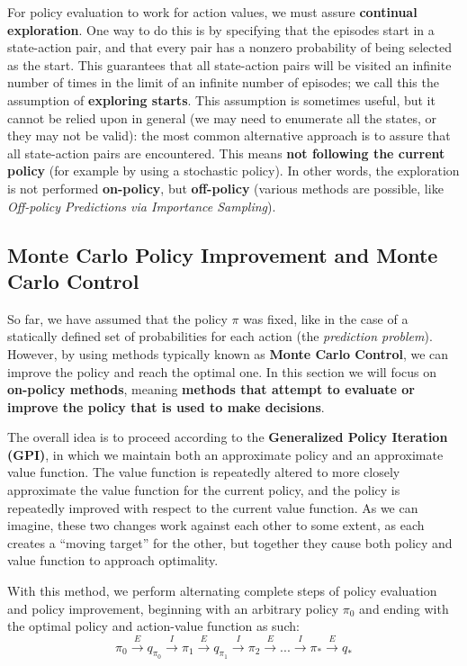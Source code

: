 For policy evaluation to work for action values, we must assure \textbf{continual exploration}. One way to do this is by specifying that the episodes start in a state-action pair, and that every pair has a nonzero probability of being selected as the start. This guarantees that all state-action pairs will be visited an infinite number of times in the limit of an infinite number of episodes; we call this the assumption of \textbf{exploring starts}. This assumption is sometimes useful, but it cannot be relied upon in general (we may need to enumerate all the states, or they may not be valid): the most common alternative approach is to assure that all state-action pairs are encountered. This means \textbf{not following the current policy} (for example by using a stochastic policy). In other words, the exploration is not performed \textbf{on-policy}, but \textbf{off-policy} (various methods are possible, like \textit{Off-policy Predictions via Importance Sampling}).

\subsection{Monte Carlo Policy Improvement and Monte Carlo Control}
So far, we have assumed that the policy $\pi$ was fixed, like in the case of a statically defined set of probabilities for each action (the \textit{prediction problem}). However, by using methods typically known as \textbf{Monte Carlo Control}, we can improve the policy and reach the optimal one. In this section we will focus on \textbf{on-policy methods}, meaning \textbf{methods that attempt to evaluate or improve the policy that is used to make decisions}.

The overall idea is to proceed according to the \textbf{Generalized Policy Iteration (GPI)}, in which we maintain both an approximate policy and an approximate value function. The value function is repeatedly altered to more closely approximate the value function for the current policy, and the policy is repeatedly improved with respect to the current value function. As we can imagine, these two changes work against each other to some extent, as each creates a ``moving target'' for the other, but together they cause both policy and value function to approach optimality.

With this method, we perform alternating complete steps of policy evaluation and policy improvement, beginning with an arbitrary policy $\pi_0$ and ending with the optimal policy and action-value function as such:
\begin{equation}
    \pi_0 \overset{E}{\rightarrow} q_{\pi_0} \overset{I}{\rightarrow} \pi_1 \overset{E}{\rightarrow} q_{\pi_1} \overset{I}{\rightarrow} \pi_2 \overset{E}{\rightarrow} ... \overset{I}{\rightarrow} \pi_* \overset{E}{\rightarrow} q_*
    \label{eq:ch3-generalizedpolicyiteration}
\end{equation}

